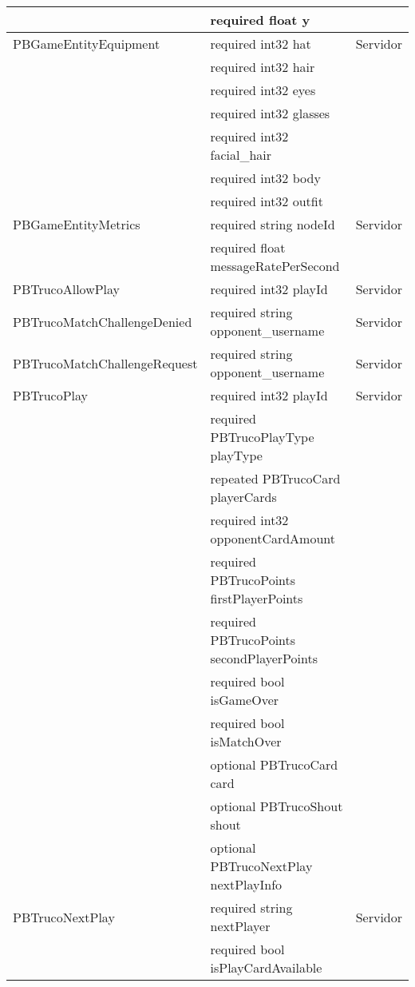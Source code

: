 \begin{longtable}{|p{}|p{}|p{}|}
                            & required float y & \\
    \hline
    PBGameEntityEquipment & required int32 hat & Servidor \\
                            & required int32 hair & \\
                            & required int32 eyes & \\
                            & required int32 glasses & \\
                            & required int32 facial\_hair & \\
                            & required int32 body & \\
                            & required int32 outfit & \\
    \hline
    PBGameEntityMetrics & required string nodeId & Servidor \\
                        & required float messageRatePerSecond & \\
    \hline
    PBTrucoAllowPlay & required int32 playId & Servidor \\
    \hline
    PBTrucoMatchChallengeDenied & required string opponent\_username & Servidor \\
    \hline
    PBTrucoMatchChallengeRequest & required string opponent\_username & Servidor \\
    \hline
    PBTrucoPlay & required int32 playId & Servidor \\
                & required PBTrucoPlayType playType & \\
                & repeated PBTrucoCard playerCards & \\
                & required int32 opponentCardAmount & \\
                & required PBTrucoPoints firstPlayerPoints & \\
                & required PBTrucoPoints secondPlayerPoints & \\
                & required bool isGameOver & \\
                & required bool isMatchOver & \\
                & optional PBTrucoCard card & \\
                & optional PBTrucoShout shout & \\
                & optional PBTrucoNextPlay nextPlayInfo & \\
    \hline
    PBTrucoNextPlay & required string nextPlayer & Servidor \\
                    & required bool isPlayCardAvailable & \\

\end{longtable}

